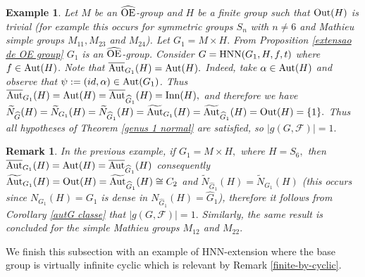 \documentclass[a4paper,12pt]{article}
\newcommand{\Oe}{\rm \widehat{OE}}
\newcommand{\F}{{\cal F}}
\def\aut {{\rm Aut}}
\def\out {{\rm Out}}
\def\inn {{\rm Inn}}
\def\hnn {{\rm HNN}}
\newtheorem{exa}[thm]{Example}
\newtheorem{rem}[thm]{Remark}
\begin{document}
{\begin{exa} Let $M$ be an $\Oe$-group and $H$ be a finite group such that $\out(H) $ is trivial (for example this occurs for symmetric groups $ S_n$ with $n \neq 6$ and Mathieu simple groups $M_{11}, M_{23}$ and $M_{24}$). %
Let $G_1=M\times H.$ From Proposition \ref{extensao de OE group} $G_1$ is an $\Oe$-group. Consider $G=\hnn(G_1,H,f,t)$ where $f\in \aut(H)$. %
Note that $\overline{\aut}_{G_1}(H)=\aut(H).$ Indeed, take $\alpha\in \aut(H)$ and observe that $\psi:=(id,\alpha) \in \aut(G_1)$. Thus $\overline{\aut}_{G_1}(H)=\aut(H)=\overline{\aut}_{\widehat G_1}(H)=\inn(H),$ and therefore we have $\widetilde{N}_{\widehat G}(H)=\widetilde{N}_{G_1}(H)=\widetilde{N}_{\widehat G_1}(H)=\widetilde\aut_{G_1}(H)=\widetilde{\aut}_{\widehat G_1}(H)=\out(H)=\{1\}.$ %
Thus all hypotheses of Theorem \ref{genus 1 normal} are satisfied, so $|g(G, \mathcal{F})|=1.$
\end{exa}

\begin{rem}
In the previous example, if $G_1=M\times H,$ where $H=S_6,$ then $\overline{\aut}_{G_1}(H)=\aut(H)=\overline{\aut}_{\widehat G_1}(H)$ consequently $\widetilde{\aut}_{G_1}(H)=\out(H)=\widetilde{\aut}_{\widehat G_1}(H) \cong C_2$ and $\widetilde{N}_{\widehat G_1}(H)=\widetilde{N}_{ G_1}(H)$ (this occurs since $N_{G_1}(H)= G_1$  is dense in $N_{\widehat G_1}(H)=\widehat G_1$), therefore it follows from Corollary \ref{autG classe} that $|g(G, \mathcal{F})|=1.$ Similarly, the same result is concluded for the simple Mathieu groups $M_{12}$ and $M_{22}.$ 
\end{rem}

 
We finish this subsection with an example of HNN-extension where the base group is virtually infinite 
cyclic which is relevant by Remark \ref{finite-by-cyclic}.


}
\end{document}
